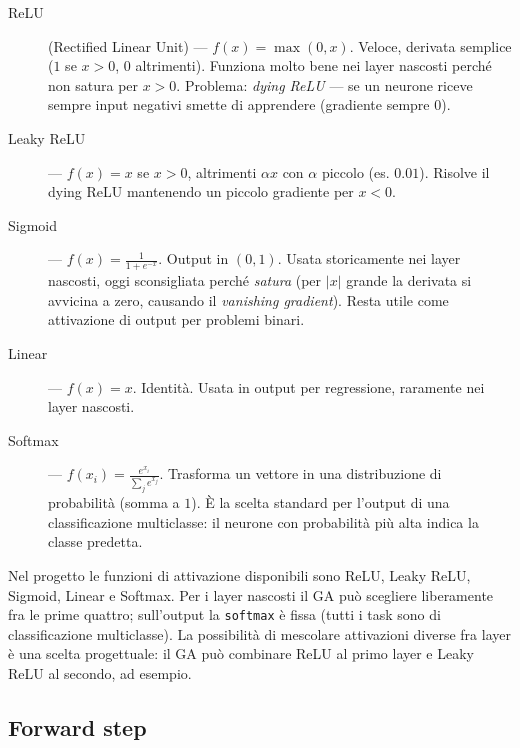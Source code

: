 \documentclass[11pt,a4paper]{article}
\newcommand{\fnt}{\texttt}     %
\begin{document}
\begin{description}
    \item[ReLU] (Rectified Linear Unit) ---
        $f(x) = \max(0, x)$.
        Veloce, derivata semplice ($1$ se $x>0$, $0$ altrimenti). Funziona
        molto bene nei layer nascosti perché non satura per $x>0$.
        Problema: \emph{dying ReLU} --- se un neurone riceve sempre input
        negativi smette di apprendere (gradiente sempre $0$).
    \item[Leaky ReLU] ---
        $f(x) = x$ se $x>0$, altrimenti $\alpha x$ con $\alpha$ piccolo
        (es. $0.01$). Risolve il dying ReLU mantenendo un piccolo
        gradiente per $x<0$.
    \item[Sigmoid] ---
        $f(x) = \frac{1}{1+e^{-x}}$. Output in $(0,1)$.
        Usata storicamente nei layer nascosti, oggi sconsigliata perché
        \emph{satura} (per $|x|$ grande la derivata si avvicina a zero,
        causando il \emph{vanishing gradient}). Resta utile come
        attivazione di output per problemi binari.
    \item[Linear] ---
        $f(x) = x$. Identità. Usata in output per regressione, raramente
        nei layer nascosti.
    \item[Softmax] ---
        $f(x_i) = \frac{e^{x_i}}{\sum_j e^{x_j}}$. Trasforma un vettore in
        una distribuzione di probabilità (somma a $1$). È la scelta
        standard per l'output di una classificazione multiclasse: il
        neurone con probabilità più alta indica la classe predetta.
\end{description}

\begin{concetto}
Nel progetto le funzioni di attivazione disponibili sono ReLU, Leaky ReLU,
Sigmoid, Linear e Softmax. Per i layer nascosti il GA può scegliere
liberamente fra le prime quattro; sull'output la \fnt{softmax} è fissa
(tutti i task sono di classificazione multiclasse). La possibilità di
mescolare attivazioni diverse fra layer è una scelta progettuale: il GA
può combinare ReLU al primo layer e Leaky ReLU al secondo, ad esempio.
\end{concetto}

\subsection{Forward step}
\end{document}
